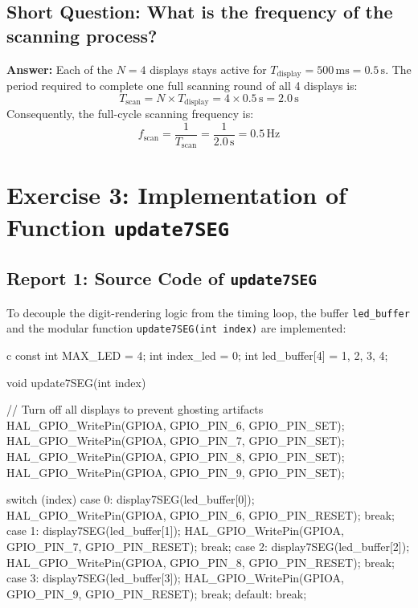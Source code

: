 \documentclass{hcmut-report}
\begin{document}
\subsection*{Short Question: What is the frequency of the scanning process?}
\textbf{Answer:}
Each of the $N = 4$ displays stays active for $T_{\text{display}} = 500\,\text{ms} = 0.5\,\text{s}$. The period required to complete one full scanning round of all 4 displays is:
\begin{equation}
    T_{\text{scan}} = N \times T_{\text{display}} = 4 \times 0.5\,\text{s} = 2.0\,\text{s}
\end{equation}
Consequently, the full-cycle scanning frequency is:
\begin{equation}
    f_{\text{scan}} = \frac{1}{T_{\text{scan}}} = \frac{1}{2.0\,\text{s}} = 0.5\,\text{Hz}
\end{equation}

\newpage
\section{Exercise 3: Implementation of Function \texttt{update7SEG}}

\subsection*{Report 1: Source Code of \texttt{update7SEG}}
To decouple the digit-rendering logic from the timing loop, the buffer \texttt{led\_buffer} and the modular function \texttt{update7SEG(int index)} are implemented:
\begin{code}{c}
const int MAX_LED = 4;
int index_led = 0;
int led_buffer[4] = {1, 2, 3, 4};

void update7SEG(int index) {
    // Turn off all displays to prevent ghosting artifacts
    HAL_GPIO_WritePin(GPIOA, GPIO_PIN_6, GPIO_PIN_SET);
    HAL_GPIO_WritePin(GPIOA, GPIO_PIN_7, GPIO_PIN_SET);
    HAL_GPIO_WritePin(GPIOA, GPIO_PIN_8, GPIO_PIN_SET);
    HAL_GPIO_WritePin(GPIOA, GPIO_PIN_9, GPIO_PIN_SET);

    switch (index) {
        case 0:
            display7SEG(led_buffer[0]);
            HAL_GPIO_WritePin(GPIOA, GPIO_PIN_6, GPIO_PIN_RESET);
            break;
        case 1:
            display7SEG(led_buffer[1]);
            HAL_GPIO_WritePin(GPIOA, GPIO_PIN_7, GPIO_PIN_RESET);
            break;
        case 2:
            display7SEG(led_buffer[2]);
            HAL_GPIO_WritePin(GPIOA, GPIO_PIN_8, GPIO_PIN_RESET);
            break;
        case 3:
            display7SEG(led_buffer[3]);
            HAL_GPIO_WritePin(GPIOA, GPIO_PIN_9, GPIO_PIN_RESET);
            break;
        default:
            break;
    }
}
\end{code}
\end{document}
